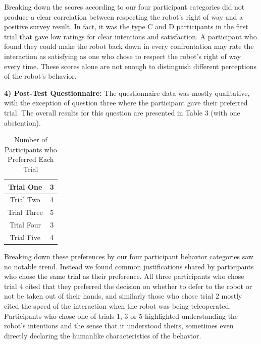 \documentclass[letterpaper, 10 pt, conference]{ieeeconf}  %
\begin{document}
Breaking down the scores according to our four participant categories did not produce a clear correlation between respecting the robot's right of way and a positive survey result. In fact, it was the type C and D participants in the first trial that gave low ratings for clear intentions and satisfaction. A participant who found they could make the robot back down in every confrontation may rate the interaction as satisfying as one who chose to respect the robot's right of way every time. These scores alone are not enough to distinguish different perceptions of the robot's behavior.

\textbf{4) Post-Test Questionnaire:} The questionnaire data was mostly qualitative, with the exception of question three where the participant gave their preferred trial. The overall results for this question are presented in Table 3 (with one abstention).

\begin{table}[h]
\caption{Number of Participants who Preferred Each Trial }
\label{Preferences}
\begin{center}
\begin{tabular}{|c||c|}
\hline
Trial One & 3\\
\hline
Trial Two & 4\\
\hline
Trial Three & 5\\
\hline
Trial Four & 3\\
\hline
Trial Five & 4\\
\hline
\end{tabular}
\end{center}
\end{table}

Breaking down these preferences by our four participant behavior categories saw no notable trend. Instead we found common justifications shared by participants who chose the same trial as their preference. All three participants who chose trial 4 cited that they preferred the decision on whether to defer to the robot or not be taken out of their hands, and similarly those who chose trial 2 mostly cited the speed of the interaction when the robot was being teleoperated. Participants who chose one of trials 1, 3 or 5 highlighted understanding the robot's intentions and the sense that it understood theirs, sometimes even directly declaring the humanlike characteristics of the behavior.

\end{document}
